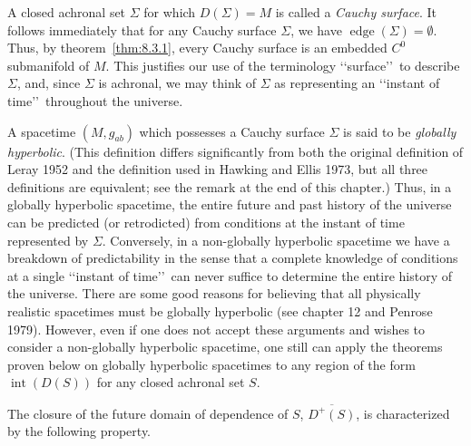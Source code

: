 A closed achronal set \(\Sigma\) for which \(D(\Sigma)=M\) is called a
\emph{Cauchy surface}. It follows immediately that for any Cauchy surface \(\Sigma\),
we have \(\operatorname{edge}(\Sigma)=\emptyset\). Thus, by theorem~\ref{thm:8.3.1},
every Cauchy surface is an embedded \(C^0\) submanifold of \(M\). This justifies our
use of the terminology \lq\lq surface\rq\rq\ to describe \(\Sigma\), and, since \(\Sigma\)
is achronal, we may think of \(\Sigma\) as representing an \lq\lq instant of time\rq\rq\
throughout the universe.

A spacetime \((M,g_{ab})\) which possesses a Cauchy surface \(\Sigma\) is said to
be \emph{globally hyperbolic}. (This definition differs significantly from both the
original definition of Leray 1952 and the definition used in Hawking and Ellis 1973,
but all three definitions are equivalent; see the remark at the end of this chapter.)
Thus, in a globally hyperbolic spacetime, the entire future and past history of the
universe can be predicted (or retrodicted) from conditions at the instant of time
represented by \(\Sigma\). Conversely, in a non-globally hyperbolic spacetime we
have a breakdown of predictability in the sense that a complete knowledge of
conditions at a single \lq\lq instant of time\rq\rq\ can never suffice to determine the
entire history of the universe. There are some good reasons for believing that all
physically realistic spacetimes must be globally hyperbolic (see chapter 12 and
Penrose 1979). However, even if one does not accept these arguments and wishes to
consider a non-globally hyperbolic spacetime, one still can apply the theorems proven
below on globally hyperbolic spacetimes to any region of the form
\(\operatorname{int}(D(S))\) for any closed achronal set \(S\).



The closure of the future domain of dependence of \(S\), \(\overline{D^+(S)}\), is
characterized by the following property.

